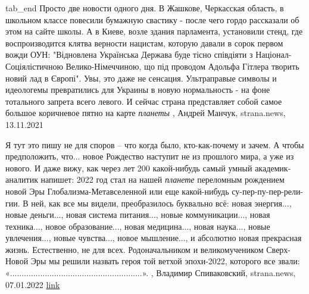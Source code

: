   tab_end
\fi
Просто две новости одного дня.  В Жашкове, Черкасская область, в школьном
классе повесили бумажную свастику - после чего гордо рассказали об этом на
сайте школы.  А в Киеве, возле здания парламента, установили стенд, где
воспроизводится клятва верности нацистам, которую давали в сорок первом вожди
ОУН: "Відновлена Українська Держава буде тісно співдіяти з
Націонал-Соціялістичною Велико-Німеччиною, що під проводом Адольфа Гітлера
творить новий лад в Європі". Увы, это даже не сенсация. Ультраправые символы и
идеологемы превратились для Украины в новую нормальность - на фоне тотального
запрета всего левого. И сейчас страна представляет собой самое большое
коричневое пятно на карте \emph{планеты}
, 
Андрей Манчук, strana.news, 13.11.2021

Я тут это пишу не для споров – что когда было, кто-как-почему и зачем.  А чтобы
предположить, что... новое Рождество наступит не из прошлого мира, а уже из
нового.  И даже вижу, как через лет 200 какой-нибудь самый умный
академик-аналитик напишет: 2022 год стал на нашей \emph{планете} переломным
рождением новой Эры Глобализма-Метавселенной или еще какой-нибудь
су-пер-пу-пер-рели-гии.  В ней, как все мы видели, преобразилось буквально всё:
новая энергия..., новые деньги..., новая система питания..., новые коммуникации...,
новая техника..., новое образование..., новая медицина..., новая наука..., новые
увлечения..., новые чувства..., новое мышление..., и абсолютно новая прекрасная
жизнь. Естественно, не для всех.  Родоначальником и великомучеником Сверх-Новой
Эры мы решили назвать героя той ветхой эпохи-2022, которого все звали:
«.........................................................».
, 
Владимир Спиваковский, strana.news, 07.01.2022
\href{https://strana.news/opinions/370586-mozhet-byt-iz-treshchin-nyneshneho-mira-voznikaet-novoe-rodzhestvo.html}{link}

